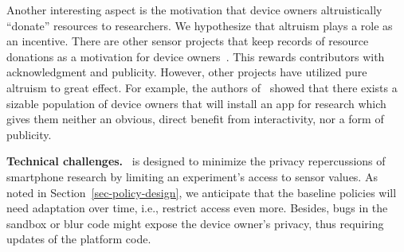 
Another interesting aspect is the motivation that 
device owners altruistically ``donate'' resources to researchers. 
We hypothesize that altruism plays a role as an incentive. 
There are other sensor projects that keep records of 
resource donations as a motivation for device owners~\cite{OpenWLANMap}.
This rewards contributors with acknowledgment and publicity. 
However, other projects have utilized pure altruism to 
great effect. For example, the authors of~\cite{wang2011untold} 
showed that there exists a sizable population of device 
owners that will install an app for research which gives them neither an obvious, 
direct benefit from interactivity, nor a form of publicity.


\textbf{Technical challenges.}~
\sysname is designed to minimize the privacy repercussions 
of smartphone research by limiting an experiment's access to sensor values.
As noted in Section~\ref{sec-policy-design}, we anticipate that 
the baseline policies will need adaptation over time, i.e., restrict 
access even more.
Besides, bugs in the sandbox or blur code might 
expose the device owner's privacy, thus requiring updates of the 
platform code.


